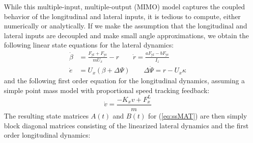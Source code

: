\documentclass[9pt,shortpaper,twoside,web]{ieeecolor}
\begin{document}
{{{ While this multiple-input, multiple-output (MIMO) model captures the coupled behavior of the longitudinal and lateral inputs, it is tedious to compute,
 either numerically or analytically. If we make the assumption that the longitudinal and lateral inputs are decoupled and make small angle approximations, we obtain the following linear state equations for the lateral dynamics: 
\begin{subequations}
\label{eq:bmC4}
\begin{align}
	\dot{\beta} &= \frac{F_\mathrm{yf}+F_\mathrm{yr}}{mU_x} - r \qquad \dot{r} = \frac{aF_\mathrm{yf} - bF_\mathrm{yr}}{I_z} \label{bm1} \\
	\dot{e} &= U_x (\beta + \Delta\Psi) \qquad \Delta\dot{\Psi} = r - U_x\kappa \label{eq:bm2} 
\end{align}
\end{subequations} 
and the following first order equation for the longitudinal dynamics, assuming a simple point mass model with proportional
speed tracking feedback:
\begin{equation}
\dot{v} = \frac{-K_xv + F^L_x}{m}
\end{equation}
The resulting state matrices $A(t)$ and $B(t)$ for (\ref{eq:ssMAT}) are then simply block diagonal matrices consisting of the
linearized lateral dynamics and the first order longitudinal dynamics:

}}}
\end{document}
